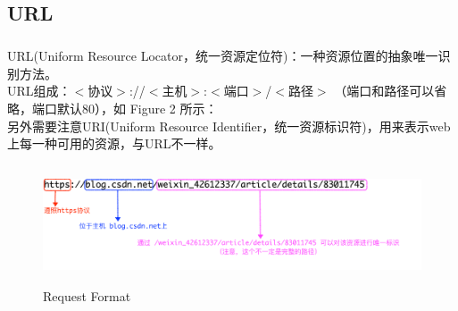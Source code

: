 \documentclass{article}
\begin{document}
	\subsection{URL}
	\subparagraph{}
	\begin{CJK}{UTF8}{gbsn}
		URL(Uniform Resource Locator，统一资源定位符)：一种资源位置的抽象唯一识别方法。\\
		URL组成：$<$协议$>$://$<$主机$>$:$<$端口$>$/$<$路径$>$ （端口和路径可以省略，端口默认80），如 Figure 2 所示： \\
		另外需要注意URI(Uniform Resource Identifier，统一资源标识符)，用来表示web上每一种可用的资源，与URL不一样。 
	\end{CJK}{}
	\begin{figure}[H]
		\centering
		\includegraphics[height = 3.5cm, width = 16cm]{pics/3_url.png}	
		\caption{Request Format}
	\end{figure}
\end{document}
